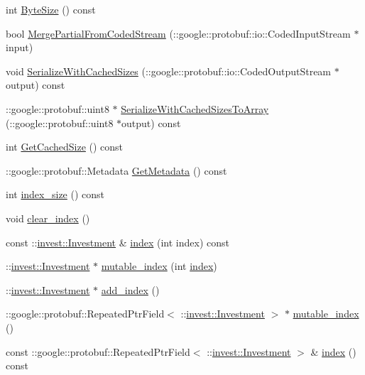 \begin{DoxyCompactItemize}
\item 
int \hyperlink{classinvest_1_1_portfolio_a00cc0a12605cecf73bce987336a137d4}{Byte\+Size} () const 
\item 
bool \hyperlink{classinvest_1_1_portfolio_a4194574449f60f226593c4a80678ddc7}{Merge\+Partial\+From\+Coded\+Stream} (\+::google\+::protobuf\+::io\+::\+Coded\+Input\+Stream $\ast$input)
\item 
void \hyperlink{classinvest_1_1_portfolio_a1cfeffe80fc00b4cc8cc64f6164e5ffc}{Serialize\+With\+Cached\+Sizes} (\+::google\+::protobuf\+::io\+::\+Coded\+Output\+Stream $\ast$output) const 
\item 
\+::google\+::protobuf\+::uint8 $\ast$ \hyperlink{classinvest_1_1_portfolio_a6730b4b275bb9903ef9326e72f6d7a33}{Serialize\+With\+Cached\+Sizes\+To\+Array} (\+::google\+::protobuf\+::uint8 $\ast$output) const 
\item 
int \hyperlink{classinvest_1_1_portfolio_af4a637c4d2a4b4b968289c36c4797cd5}{Get\+Cached\+Size} () const 
\item 
\+::google\+::protobuf\+::\+Metadata \hyperlink{classinvest_1_1_portfolio_ab2cd86320ab4ffe068b252af0247db49}{Get\+Metadata} () const 
\item 
int \hyperlink{classinvest_1_1_portfolio_a4815732b49ce9ac8a86ed436af601c4f}{index\+\_\+size} () const 
\item 
void \hyperlink{classinvest_1_1_portfolio_a9488e41aa738ca6f2c7300104d05031c}{clear\+\_\+index} ()
\item 
const \+::\hyperlink{classinvest_1_1_investment}{invest\+::\+Investment} \& \hyperlink{classinvest_1_1_portfolio_a997176b3cd6272bf86026a9bbb897e5a}{index} (int index) const 
\item 
\+::\hyperlink{classinvest_1_1_investment}{invest\+::\+Investment} $\ast$ \hyperlink{classinvest_1_1_portfolio_a8e006e467318ebff5c8e213822b1e5aa}{mutable\+\_\+index} (int \hyperlink{classinvest_1_1_portfolio_a997176b3cd6272bf86026a9bbb897e5a}{index})
\item 
\+::\hyperlink{classinvest_1_1_investment}{invest\+::\+Investment} $\ast$ \hyperlink{classinvest_1_1_portfolio_a3f1796c728dc0c3f689d58a49378478f}{add\+\_\+index} ()
\item 
\+::google\+::protobuf\+::\+Repeated\+Ptr\+Field$<$ \+::\hyperlink{classinvest_1_1_investment}{invest\+::\+Investment} $>$ $\ast$ \hyperlink{classinvest_1_1_portfolio_a6dde370dcb52d6ad53397a888d6e82bb}{mutable\+\_\+index} ()
\item 
const \+::google\+::protobuf\+::\+Repeated\+Ptr\+Field$<$ \+::\hyperlink{classinvest_1_1_investment}{invest\+::\+Investment} $>$ \& \hyperlink{classinvest_1_1_portfolio_a182c88491449e6ceb1436b7645c0b00c}{index} () const 
\end{DoxyCompactItemize}
